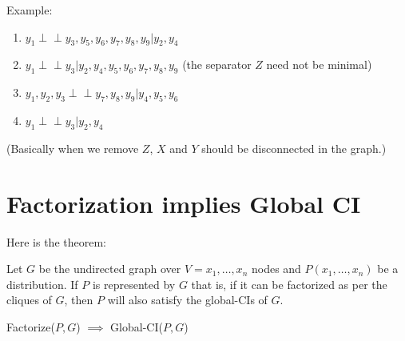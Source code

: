 \documentclass[a4paper]{article}
\begin{document}
\begin{minipage}{0.55\textwidth} 
    Example:
    \begin{enumerate}
        \item $y_1 \perp\!\!\!\perp y_3, y_5, y_6, y_7, y_8, y_9 | y_2, y_4$
        \item $y_1 \perp\!\!\!\perp y_3|y_2,y_4,y_5,y_6,y_7,y_8,y_9$ (the separator $Z$ need not be minimal)
        \item $y_1,y_2,y_3 \perp\!\!\!\perp y_7,y_8,y_9|y_4,y_5,y_6$
        \item $y_1 \perp\!\!\!\perp y_3|y_2,y_4$
    \end{enumerate}

    (Basically when we remove $Z$, $X$ and $Y$ should be disconnected in the graph.)

\end{minipage}
\hfill 
\begin{minipage}{0.40\textwidth} 
\end{minipage}

\section{Factorization implies Global CI}
Here is the theorem:

Let $G$ be the undirected graph over $V = x_1, \dots, x_n$ nodes and $P(x_1, \dots, x_n)$ be a distribution. If $P$ is represented by $G$ that is, if it can be factorized as per the cliques of $G$, then $P$ will also satisfy the global-CIs of $G$.

Factorize($P, G$) $\implies$ Global-CI($P, G$)
\end{document}
